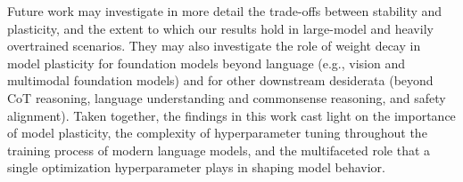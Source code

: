 Future work may investigate in more detail the trade-offs between stability and plasticity, and the extent to which our results hold in large-model and heavily overtrained scenarios. They may also investigate the role of weight decay in model plasticity for foundation models beyond language (e.g., vision and multimodal foundation models) and for other downstream desiderata (beyond CoT reasoning, language understanding and commonsense reasoning, and safety alignment).
Taken together, the findings in this work cast light on the importance of model plasticity, the complexity of hyperparameter tuning throughout the training process of modern language models, and the multifaceted role that a single optimization hyperparameter plays in shaping model behavior.

